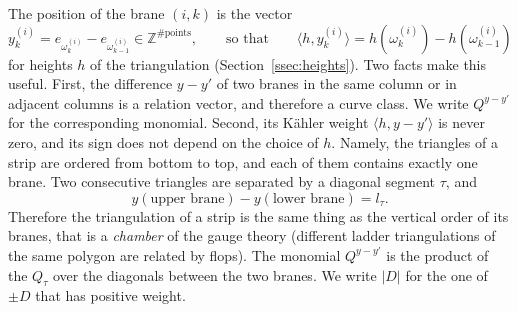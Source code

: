 \documentclass[11pt]{article}
\theoremstyle{plain}
\theoremstyle{definition}
\theoremstyle{remark}
\newcommand{\Z}{\mathbb{Z}}
\begin{document}
The position of the brane $(i,k)$ is the vector
\begin{equation}
y^{(i)}_k=e_{\omega^{(i)}_k}-e_{\omega^{(i)}_{k-1}}\in\Z^{\#\text{points}},\qquad\text{so that}\qquad
\langle h,y^{(i)}_k\rangle=h(\omega^{(i)}_k)-h(\omega^{(i)}_{k-1})
\end{equation}
for heights $h$ of the triangulation (Section~\ref{ssec:heights}). Two facts make this useful.
First, the difference $y-y'$ of two branes in the same column or in adjacent columns is a
relation vector, and therefore a curve class. We write $Q^{y-y'}$ for the corresponding
monomial.
Second, its K\"ahler weight $\langle h,y-y'\rangle$ is never zero, and its sign does not depend on
the choice of $h$. Namely, the triangles of a strip are ordered from bottom to top, and each of
them contains exactly one brane. Two consecutive triangles are separated by a diagonal segment
$\tau$, and
\begin{equation}
y(\text{upper brane})-y(\text{lower brane})=l_\tau .
\end{equation}
Therefore the triangulation of a strip is the same thing as the vertical order of its branes,
that is a \textit{chamber} of the gauge theory (different ladder triangulations of the same
polygon are related by flops). The monomial $Q^{y-y'}$ is the product of the $Q_\tau$ over the
diagonals between the two branes. We write $|D|$ for the one of $\pm D$ that has positive
weight.
\end{document}
